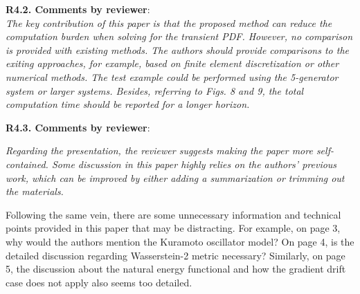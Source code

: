 \documentclass[12pt,onecolumn]{IEEEtran}
\newcommand{\blue}{\color{blue}}
\newcommand{\red}{\textcolor{red}}
\newcommand{\nib}{\noindent  {\bf Response:} }
\begin{document}
\noindent
{\bf R4.2. Comments by reviewer}:\\
{\em The key contribution of this paper is that the proposed method can reduce the computation burden when solving for the transient PDF. However, no comparison is provided with existing methods. The authors should provide comparisons to the exiting approaches, for example, based on finite element discretization or other numerical methods. The test example could be performed using the 5-generator system or larger systems. Besides, referring to Figs. 8 and 9, the total computation time should be reported for a longer horizon.}

{\nib \blue{ {\red{TBD.}}}}


\noindent
{\bf R4.3. Comments by reviewer}:\\
{\em Regarding the presentation, the reviewer suggests making the paper more self-contained. Some discussion in this paper highly relies on the authors' previous work, which can be improved by either adding a summarization or trimming out the materials.

Following the same vein, there are some unnecessary information and technical points provided in this paper that may be distracting.
For example, on page 3, why would the authors mention the Kuramoto oscillator model?
On page 4, is the detailed discussion regarding Wasserstein-2 metric necessary? Similarly, on page 5, the discussion about the natural energy functional and how the gradient drift case does not apply also seems too detailed.}
\end{document}
